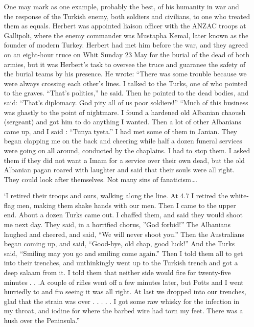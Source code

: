 One may mark as one example, probably the best, of his humanity in war and the response of the Turkish enemy, both soldiers and civilians, to one who treated them as equals. Herbert was appointed liaison officer with the ANZAC troops at Gallipoli, where the enemy commander was Mustapha Kemal, later known as the founder of modern Turkey. Herbert had met him before the war, and they agreed on an eight-hour truce on Whit Sunday 23 May for the burial of the dead of both armies, but it was Herbert’s task to oversee the truce and guaranee the safety of the burial teams by his presence. He wrote: “There was some trouble because we were always crossing each other’s lines. I talked to the Turks, one of who pointed to the graves. “That’s politics,” he said. Then he pointed to the dead bodies, and said: “That’s diplomacy. God pity all of us poor soldiers!” “Much of this business was ghastly to the point of nightmare. I found a hardened old Albanian chaoush (sergeant) and got him to do anything I wanted. Then a lot of other Albanians came up, and I said : “Tunya tyeta.” I had met some of them in Janian. They began clapping me on the back and cheering while half a dozen funeral services were going on all around, conducted by the chaplains. I had to stop them. I asked them if they did not want a Imam for a service over their own dead, but the old Albanian pagan roared with laughter and said that their souls were all right. They could look after themselves. Not many sins of fanaticism….

‘I retired their troops and ours, walking along the line. At 4.7 I retired the white-flag men, making them shake hands with our men. Then I came to the upper end. About a dozen Turks came out. I chaffed them, and said they would shoot me next day. They said, in a horrified chorus, ”God forbid!” The Albanians laughed and cheered, and said, “We will never shoot you.” Then the Australians began coming up, and said, “Good-bye, old chap, good luck!” And the Turks said, “Smiling may you go and smiling come again.” Then I told them all to get into their trenches, and unthinkingly went up to the Turkish trench and got a deep salaam from it. I told them that neither side would fire for twenty-five minutes . . .A couple of rifles went off a few minutes later, but Potts and I went hurriedly to and fro seeing it was all right. At last we dropped into our trenches, glad that the strain was over . . . . . I got some raw whisky for the infection in my throat, and iodine for where the barbed wire had torn my feet. There was a hush over the Peninsula.” 

